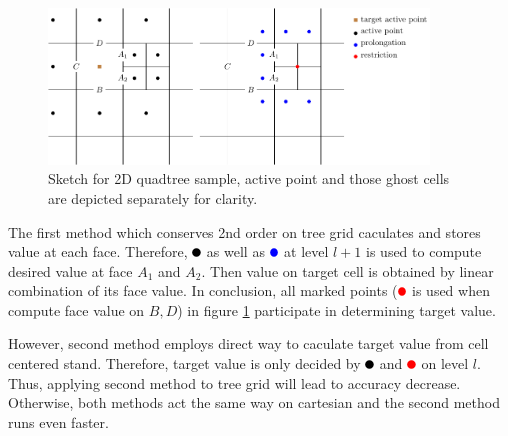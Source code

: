 \begin{figure}[H]
    \centering
    \includegraphics[width=0.9\textwidth]{./image/viscosity-h/cellandface}
    \caption{Sketch for 2D quadtree sample, active point and those ghost cells are depicted separately for clarity.}
    \label{fig:viscosity-cellandface}
\end{figure}
The first method which conserves 2nd order on tree grid caculates and stores value at each face. Therefore, $\activetest$ as well as $\prolong$ at level $l+1$ is used to compute desired value at face $A_1$ and $A_2$. Then value on target cell is obtained by linear combination of its face value. In conclusion, all marked points ($\rest$ is used when compute face value on $B,D$) in figure \ref{fig:viscosity-cellandface} participate in determining target value. \par
However, second method employs direct way to caculate target value from cell centered stand. Therefore, target value is only decided by $\activetest$ and $\rest$ on level $l$. Thus, applying second method to tree grid will lead to accuracy decrease. Otherwise, both methods act the same way on cartesian and the second method runs even faster. 

